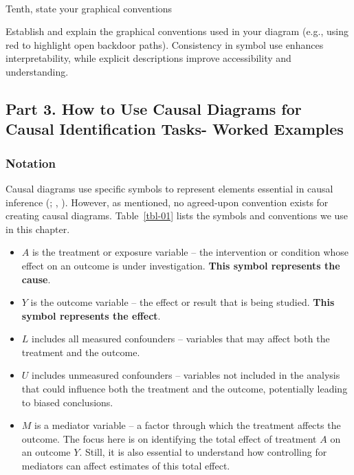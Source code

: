 \documentclass[
  singlecolumn]{article}
\makeatletter
\let\oldparagraph\paragraph
\renewcommand{\paragraph}{
    \@ifstar
      \xxxParagraphStar
      \xxxParagraphNoStar
  }
\newcommand{\xxxParagraphStar}[1]{\oldparagraph*{#1}\mbox{}}
\newcommand{\xxxParagraphNoStar}[1]{\oldparagraph{#1}\mbox{}}
\providecommand{\tightlist}{%
  \setlength{\itemsep}{0pt}\setlength{\parskip}{0pt}}\usepackage{longtable,booktabs,array}
\makeatother
\begin{document}
\paragraph{Tenth, state your graphical
conventions}\label{tenth-state-your-graphical-conventions}

Establish and explain the graphical conventions used in your diagram
(e.g., using red to highlight open backdoor paths). Consistency in
symbol use enhances interpretability, while explicit descriptions
improve accessibility and understanding.

\subsection{Part 3. How to Use Causal Diagrams for Causal Identification
Tasks- Worked Examples}\label{section-part3}

\subsubsection{Notation}\label{notation}

Causal diagrams use specific symbols to represent elements essential in
causal inference (; ,
). However, as mentioned, no agreed-upon
convention exists for creating causal diagrams. Table~\ref{tbl-01} lists
the symbols and conventions we use in this chapter.

\begin{itemize}
\tightlist
\item
  \textbf{\(A\)} is the treatment or exposure variable -- the
  intervention or condition whose effect on an outcome is under
  investigation. \textbf{This symbol represents the cause}.
\item
  \textbf{\(Y\)} is the outcome variable -- the effect or result that is
  being studied. \textbf{This symbol represents the effect}.
\item
  \textbf{\(L\)} includes all measured confounders -- variables that may
  affect both the treatment and the outcome.
\item
  \textbf{\(U\)} includes unmeasured confounders -- variables not
  included in the analysis that could influence both the treatment and
  the outcome, potentially leading to biased conclusions.
\item
  \textbf{\(M\)} is a mediator variable -- a factor through which the
  treatment affects the outcome. The focus here is on identifying the
  total effect of treatment \(A\) on an outcome \(Y\). Still, it is also
  essential to understand how controlling for mediators can affect
  estimates of this total effect.
\end{itemize}
\end{document}
